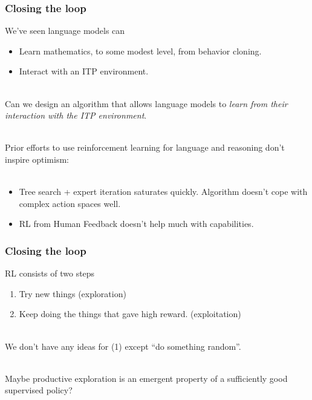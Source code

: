 \documentclass[handout]{beamer}
\begin{document}
\begin{frame}
\frametitle{Closing the loop}
We've seen language models can 
\begin{itemize}
    \item Learn mathematics, to some modest level, from behavior cloning.
    \item Interact with an ITP environment.\\~\
\end{itemize}
\pause
Can we design an algorithm that allows language models to {\it learn from their interaction with the ITP environment}.\\~\

\pause
Prior efforts to use reinforcement learning for language and reasoning don't inspire optimism:\\~\
\begin{itemize}
    \item Tree search + expert iteration saturates quickly. Algorithm doesn't cope with complex action spaces well. 
    \item RL from Human Feedback doesn't help much with capabilities.
\end{itemize}
\end{frame}

\begin{frame}
\frametitle{Closing the loop}
RL consists of two steps
\begin{enumerate}
    \item Try new things (exploration)
    \item Keep doing the things that gave high reward. (exploitation)\\~\
\end{enumerate}
We don't have any ideas for (1) except ``do something random''. \\~\

\pause
Maybe productive exploration is an emergent property of a sufficiently good supervised policy?
\end{frame}
\end{document}
